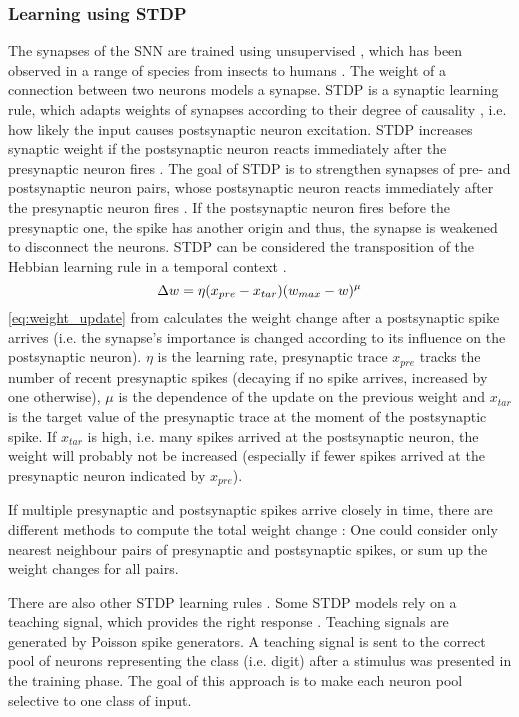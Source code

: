 \subsubsection{Learning using \ac{STDP}}
The synapses of the \ac{SNN} are trained using unsupervised , which has been observed in a range of species from insects to humans \cite{STDP_hebbian}. 
The weight of a connection between two neurons models a synapse.
\ac{STDP} is a synaptic learning rule, which adapts weights of synapses according to their degree of causality \cite{STDP_like,multi_scale_STDP},
 i.e. how likely the input causes postsynaptic neuron excitation.
\ac{STDP} increases synaptic weight if the postsynaptic neuron reacts immediately after the presynaptic neuron fires \cite{object_detection_SNN}.
The goal of \ac{STDP} is to strengthen synapses of pre- and postsynaptic neuron pairs, 
whose postsynaptic neuron reacts immediately after the presynaptic neuron fires \cite{object_detection_SNN}.
If the postsynaptic neuron fires before the presynaptic one, the spike has another origin and thus, the synapse is weakened to disconnect the neurons.
\ac{STDP} can be considered the transposition of the Hebbian learning rule in a temporal context \cite{STDP_vis_feat}.
%
\begin{equation}
    \centering
    \label{eq:weight_update}
    \Delta w = \eta (x_{pre} - x_{tar})(w_{max}-w)^\mu
\end{equation}
%
\autoref{eq:weight_update} from \cite{SNN} calculates the weight change after a postsynaptic spike arrives 
(i.e. the synapse's importance is changed according to its influence on the postsynaptic neuron).
$\eta$ is the learning rate, presynaptic trace $x_{pre}$ tracks the number of recent presynaptic spikes 
(decaying if no spike arrives, increased by one otherwise), 
$\mu$ is the dependence of the update on the previous weight and 
$x_{tar}$ is the target value of the presynaptic trace at the moment of the postsynaptic spike.
If $x_{tar}$ is high, i.e. many spikes arrived at the postsynaptic neuron, the weight will probably not be increased 
(especially if fewer spikes arrived at the presynaptic neuron indicated by  $x_{pre}$).

If multiple presynaptic and postsynaptic spikes arrive closely in time, there are different methods to compute the total weight change \cite{simulation_STDP}:
One could consider only nearest neighbour pairs of presynaptic and postsynaptic spikes, or sum up the weight changes for all pairs.

There are also other \ac{STDP} learning rules \cite{SNN,STDP_random}.
Some \ac{STDP} models rely on a teaching signal, which provides the right response \cite{STDP_like}.
Teaching signals are generated by Poisson spike generators.
A teaching signal is sent to the correct pool of neurons representing the class (i.e. digit) after a stimulus was presented in the training phase.
The goal of this approach is to make each neuron pool selective to one class of input.

